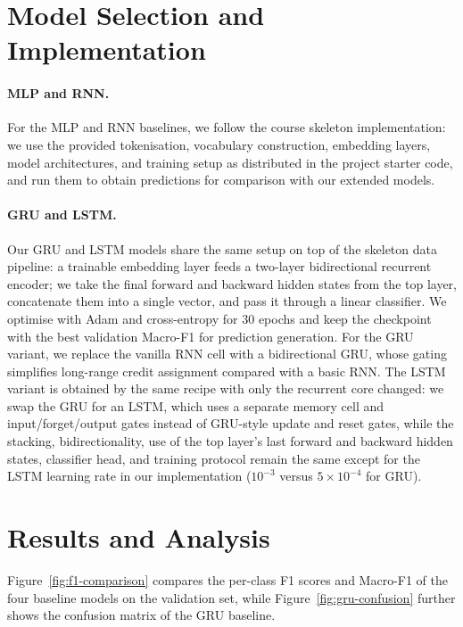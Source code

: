 \documentclass[10pt,twocolumn,letterpaper]{article}
\begin{document}
\section{Model Selection and Implementation}

\paragraph{MLP and RNN.}
\noindent For the MLP and RNN baselines, we follow the course skeleton implementation: we use the provided tokenisation, vocabulary construction, embedding layers, model architectures, and training setup as distributed in the project starter code, and run them to obtain predictions for comparison with our extended models.

\paragraph{GRU and LSTM.}
\noindent Our GRU and LSTM models share the same setup on top of the skeleton data pipeline: a trainable embedding layer feeds a two-layer bidirectional recurrent encoder; we take the final forward and backward hidden states from the top layer, concatenate them into a single vector, and pass it through a linear classifier. We optimise with Adam and cross-entropy for 30 epochs and keep the checkpoint with the best validation Macro-F1 for prediction generation.
For the GRU variant, we replace the vanilla RNN cell with a bidirectional GRU, whose gating simplifies long-range credit assignment compared with a basic RNN.
The LSTM variant is obtained by the same recipe with only the recurrent core changed: we swap the GRU for an LSTM, which uses a separate memory cell and input/forget/output gates instead of GRU-style update and reset gates, while the stacking, bidirectionality, use of the top layer's last forward and backward hidden states, classifier head, and training protocol remain the same except for the LSTM learning rate in our implementation ($10^{-3}$ versus $5\times10^{-4}$ for GRU).

\section{Results and Analysis}

\noindent Figure~\ref{fig:f1-comparison} compares the per-class F1 scores and Macro-F1 of the four baseline models on the validation set, while Figure~\ref{fig:gru-confusion} further shows the confusion matrix of the GRU baseline.
\end{document}
